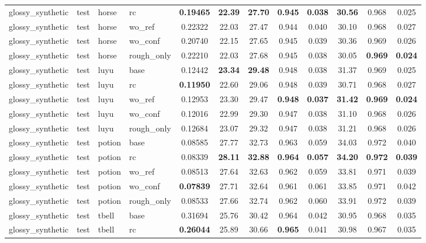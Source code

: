 \begin{table}[t]
{\begin{tabular}{llllcccccccc}
glossy\_synthetic & test & horse & rc & \textbf{0.19465} & \textbf{22.39} & \textbf{27.70} & \textbf{0.945} & \textbf{0.038} & \textbf{30.56} & 0.968 & 0.025 \\
glossy\_synthetic & test & horse & wo\_ref & 0.22322 & 22.03 & 27.47 & 0.944 & 0.040 & 30.10 & 0.968 & 0.027 \\
glossy\_synthetic & test & horse & wo\_conf & 0.20740 & 22.15 & 27.65 & 0.945 & 0.039 & 30.36 & 0.969 & 0.026 \\
glossy\_synthetic & test & horse & rough\_only & 0.22210 & 22.03 & 27.68 & 0.945 & 0.038 & 30.05 & \textbf{0.969} & \textbf{0.024} \\
glossy\_synthetic & test & luyu & base & 0.12442 & \textbf{23.34} & \textbf{29.48} & 0.948 & 0.038 & 31.37 & 0.969 & 0.025 \\
glossy\_synthetic & test & luyu & rc & \textbf{0.11950} & 22.60 & 29.06 & 0.948 & 0.039 & 30.71 & 0.968 & 0.027 \\
glossy\_synthetic & test & luyu & wo\_ref & 0.12953 & 23.30 & 29.47 & \textbf{0.948} & \textbf{0.037} & \textbf{31.42} & \textbf{0.969} & \textbf{0.024} \\
glossy\_synthetic & test & luyu & wo\_conf & 0.12016 & 22.99 & 29.30 & 0.947 & 0.038 & 31.10 & 0.968 & 0.026 \\
glossy\_synthetic & test & luyu & rough\_only & 0.12684 & 23.07 & 29.32 & 0.947 & 0.038 & 31.21 & 0.968 & 0.026 \\
glossy\_synthetic & test & potion & base & 0.08585 & 27.77 & 32.73 & 0.963 & 0.059 & 34.03 & 0.972 & 0.040 \\
glossy\_synthetic & test & potion & rc & 0.08339 & \textbf{28.11} & \textbf{32.88} & \textbf{0.964} & \textbf{0.057} & \textbf{34.20} & \textbf{0.972} & \textbf{0.039} \\
glossy\_synthetic & test & potion & wo\_ref & 0.08513 & 27.64 & 32.63 & 0.962 & 0.059 & 33.81 & 0.971 & 0.039 \\
glossy\_synthetic & test & potion & wo\_conf & \textbf{0.07839} & 27.71 & 32.64 & 0.961 & 0.061 & 33.85 & 0.971 & 0.042 \\
glossy\_synthetic & test & potion & rough\_only & 0.08533 & 27.66 & 32.74 & 0.962 & 0.060 & 33.91 & 0.972 & 0.039 \\
glossy\_synthetic & test & tbell & base & 0.31694 & 25.76 & 30.42 & 0.964 & 0.042 & 30.95 & 0.968 & 0.035 \\
glossy\_synthetic & test & tbell & rc & \textbf{0.26044} & 25.89 & 30.66 & \textbf{0.965} & 0.041 & 30.98 & 0.967 & 0.035 \\

\end{tabular}}
\end{table}
